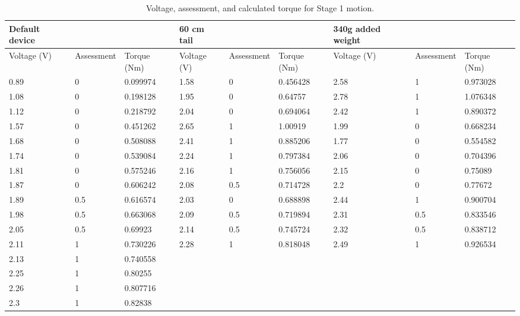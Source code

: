 \begin{landscape}

\begin{table}[!ht]
	\centering
	\caption{Voltage, assessment, and calculated torque for Stage 1 motion.}
	\footnotesize
	\begin{tabular}{|l|l|l|l|l|l|l|l|l|}
		\hline
		Default device & ~ & ~ & 60 cm tail & ~ & ~ & 340g added weight & ~ & ~ \\ \hline
		Voltage (V) & Assessment & Torque (Nm) & Voltage (V) & Assessment & Torque (Nm) & Voltage (V) & Assessment & Torque (Nm) \\ \hline
		0.89 & 0 & 0.099974 & 1.58 & 0 & 0.456428 & 2.58 & 1 & 0.973028 \\ \hline
		1.08 & 0 & 0.198128 & 1.95 & 0 & 0.64757 & 2.78 & 1 & 1.076348 \\ \hline
		1.12 & 0 & 0.218792 & 2.04 & 0 & 0.694064 & 2.42 & 1 & 0.890372 \\ \hline
		1.57 & 0 & 0.451262 & 2.65 & 1 & 1.00919 & 1.99 & 0 & 0.668234 \\ \hline
		1.68 & 0 & 0.508088 & 2.41 & 1 & 0.885206 & 1.77 & 0 & 0.554582 \\ \hline
		1.74 & 0 & 0.539084 & 2.24 & 1 & 0.797384 & 2.06 & 0 & 0.704396 \\ \hline
		1.81 & 0 & 0.575246 & 2.16 & 1 & 0.756056 & 2.15 & 0 & 0.75089 \\ \hline
		1.87 & 0 & 0.606242 & 2.08 & 0.5 & 0.714728 & 2.2 & 0 & 0.77672 \\ \hline
		1.89 & 0.5 & 0.616574 & 2.03 & 0 & 0.688898 & 2.44 & 1 & 0.900704 \\ \hline
		1.98 & 0.5 & 0.663068 & 2.09 & 0.5 & 0.719894 & 2.31 & 0.5 & 0.833546 \\ \hline
		2.05 & 0.5 & 0.69923 & 2.14 & 0.5 & 0.745724 & 2.32 & 0.5 & 0.838712 \\ \hline
		2.11 & 1 & 0.730226 & 2.28 & 1 & 0.818048 & 2.49 & 1 & 0.926534 \\ \hline
		2.13 & 1 & 0.740558 & ~ & ~ & ~ & ~ & ~ & ~ \\ \hline
		2.25 & 1 & 0.80255 & ~ & ~ & ~ & ~ & ~ & ~ \\ \hline
		2.26 & 1 & 0.807716 & ~ & ~ & ~ & ~ & ~ & ~ \\ \hline
		2.3 & 1 & 0.82838   & ~ & ~ & ~ & ~ & ~ & ~ \\ \hline
	\end{tabular}
\end{table}


\end{landscape}
